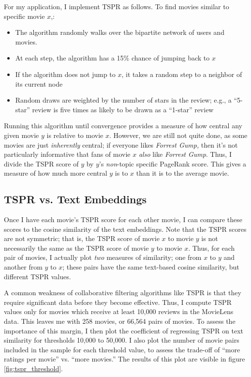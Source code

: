 \documentclass{article}
\begin{document}
For my application, I implement TSPR as follows. To find movies similar to specific movie $x$,:
\begin{itemize}
    \item The algorithm randomly walks over the bipartite network of users and movies. 
    \item At each step, the algorithm has a 15\% chance of jumping back to $x$
    \item If the algorithm does not jump to $x$, it takes a random step to a neighbor of its current node
    \item Random draws are weighted by the number of stars in the review; e.g., a ``5-star'' review is five times as likely to be drawn as a ``1-star'' review
\end{itemize}

Running this algorithm until convergence provides a measure of how central any given movie $y$ is relative to movie $x$. However, we are still not quite done, as some movies are just \emph{inherently} central; if everyone likes \emph{Forrest Gump,} then it's not particularly informative that fans of movie $x$ \emph{also} like \emph{Forrest Gump}. Thus, I divide the TSPR score of $y$ by $y$'s \emph{non}-topic specific PageRank score. This gives a measure of how much more central $y$ is to $x$ than it is to the average movie. 

\subsection{TSPR vs. Text Embeddings}

Once I have each movie's TSPR score for each other movie, I can compare these scores to the cosine similarity of the text embeddings. Note that the TSPR scores are not symmetric; that is, the TSPR score of movie $x$ to movie $y$ is not necessarily the same as the TSPR score of movie $y$ to movie $x$. Thus, for each pair of movies, I actually plot \emph{two} measures of similarity; one from $x$ to $y$ and another from $y$ to $x$; these pairs have the same text-based cosine similarity, but different TSPR values. 

A common weakness of collaborative filtering algorithms like TSPR is that they require significant data before they become effective. Thus, I compute TSPR values only for movies which receive at least 10,000 reviews in the MovieLens data. This leaves me with 258 movies, or 66,564 pairs of movies. To assess the importance of this margin, I then plot the coefficient of regressing TSPR on text similarity for thresholds 10,000 to 50,000. I also plot the number of movie pairs included in the sample for each threshold value, to assess the trade-off of ``more ratings per movie'' vs. ``more movies.'' The results of this plot are visible in figure \ref{fig:tspr_threshold}. 
\end{document}
